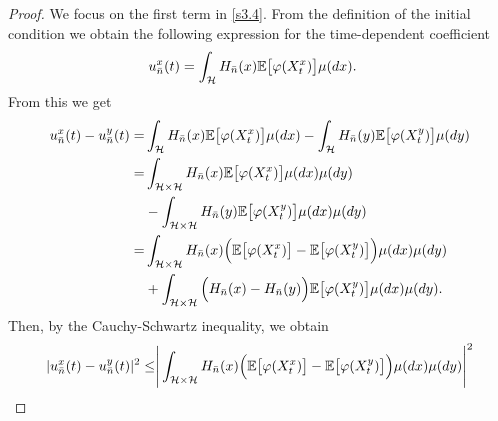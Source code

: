 \documentclass[review, onefignum, onetabnum]{siamart171218}
\begin{document}
\begin{proof}
    We focus on the first term in \eqref{s3.4}. From the definition of the 
initial condition we obtain the following expression for 
the time-dependent coefficient
\begin{align*}
  u_{\bar n}^x(t) &= 
    \int_{\mathcal{H}} H_{\bar n}(x) \mathbb{E}\big[\varphi(X_t^x)\big] \mu(dx).
\end{align*}
%
From this we get
\begin{align*}
    u_{\bar n}^x(t)-u_{\bar n}^y(t)
        =&
        \int_{\mathcal{H}} H_{\bar n}(x) 
            \mathbb{E}\big[
                \varphi(X_t^x)
            \big] 
            \mu(dx) -
            \int_{\mathcal{H}} H_{\bar n}(y) 
            \mathbb{E}\big[
                \varphi(X_t^y)
            \big] \mu(dy)
        \\
        =&
        \int_{\mathcal{H} \times \mathcal{H}} H_{\bar n}(x) 
            \mathbb{E}\big[
                \varphi(X_t^x)
            \big] \mu(dx)\mu(dy) 
        \\
        &-
             \int_{\mathcal{H}\times \mathcal{H}} H_{\bar n}(y) 
                \mathbb{E}\big[
                    \varphi(X_t^y)
                \big] 
            \mu(dx)\mu(dy)
        \\
        =& 
        \int_{\mathcal{H}\times \mathcal{H}} H_{\bar n}(x)
            \Big( 
                \mathbb{E}\big[
                    \varphi(X_t^x)
                \big]
                -
                \mathbb{E}\big[
                    \varphi(X_t^y)
                \big] 
            \Big)
            \mu(dx)\mu(dy) 
        \\
        &+
        \int_{\mathcal{H}\times \mathcal{H}}
            \Big(
                H_{\bar n}(x) - H_{\bar n}(y)
            \Big) 
            \mathbb{E}\big[
                \varphi(X_t^y)
            \big] \mu(dx) \mu(dy) .
\end{align*}
%
%
Then, by the Cauchy-Schwartz inequality, we obtain
%
%
\begin{equation} 
    \label{s3.4.1}
    \begin{aligned}
        |u_{\bar n} ^ x(t) - u_{\bar n} ^ y(t)| ^ 2
            \le& 
            \Bigg |
                \int_{\mathcal{H} \times 
                \mathcal{H}} H_{\bar n}(x)
                \Big( 
                    \E
                     \big[
                        \varphi(X_t^x)
                     \big]
                     -
                    \E\big[
                        \varphi(X_t^y)
                    \big] 
                \Big) \mu(dx)\mu(dy) 
                \Bigg|^2
            \\

\end{aligned}
\end{equation}
\end{proof}
\end{document}
